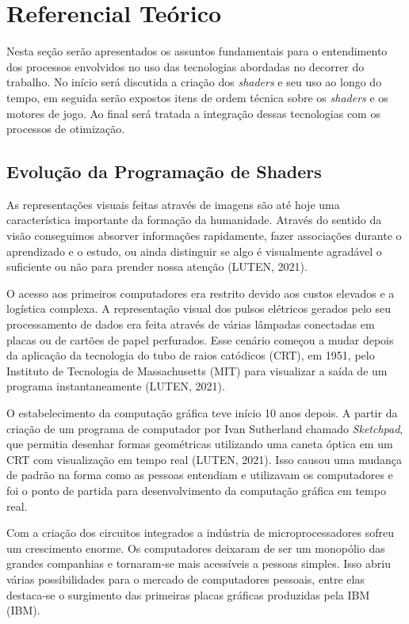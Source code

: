 \chapter{Referencial Teórico}
\label{cap:referencial-teorico}

Nesta seção serão apresentados os assuntos fundamentais para o entendimento dos processos envolvidos no uso das tecnologias abordadas no decorrer do trabalho. No início será discutida a criação dos \textit{shaders} e seu uso ao longo do tempo, em seguida serão expostos itens de ordem técnica sobre os \textit{shaders} e os motores de jogo. Ao final será tratada a integração dessas tecnologias com os processos de otimização.

\section{Evolução da Programação de Shaders}
\label{sec:historia-evolucao-programacao-shaders}

As representações visuais feitas através de imagens são até hoje uma característica importante da formação da humanidade. Através do sentido da visão conseguimos absorver informações rapidamente, fazer associações durante o aprendizado e o estudo, ou ainda distinguir se algo é visualmente agradável o suficiente ou não para prender nossa atenção (LUTEN, 2021)\nocite{openGLBook}.

O acesso aos primeiros computadores era restrito devido aos custos elevados e a logística complexa. A representação visual dos pulsos elétricos gerados pelo seu processamento de dados era feita através de várias lâmpadas conectadas em placas ou de cartões de papel perfurados. Esse cenário começou a mudar depois da aplicação da tecnologia do tubo de raios catódicos (\acrshort{CRT}), em 1951, pelo Instituto de Tecnologia de Massachusetts (MIT) para visualizar a saída de um programa instantaneamente (LUTEN, 2021)\nocite{openGLBook}.

O estabelecimento da computação gráfica teve início 10 anos depois. A partir da criação de um programa de computador por Ivan Sutherland chamado \textit{Sketchpad}, que permitia desenhar formas geométricas utilizando uma caneta óptica em um \acrshort{CRT} com visualização em tempo real (LUTEN, 2021)\nocite{openGLBook}. Isso causou uma mudança de padrão na forma como as pessoas entendiam e utilizavam os computadores e foi o ponto de partida para desenvolvimento da computação gráfica em tempo real.
	
Com a criação dos circuitos integrados a indústria de microprocessadores sofreu um crescimento enorme. Os computadores deixaram de ser um monopólio das grandes companhias e tornaram-se mais acessíveis a pessoas simples. Isso abriu várias possibilidades para o mercado de computadores pessoais, entre elas destaca-se o surgimento das primeiras placas gráficas produzidas pela \acrlong{IBM} (IBM).   
	
